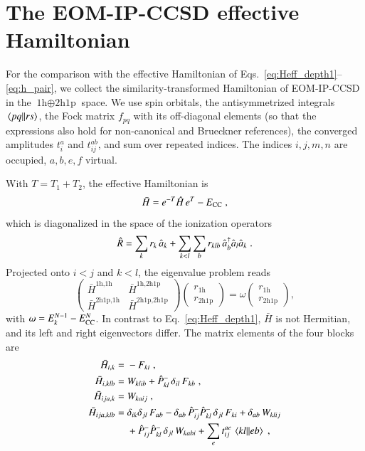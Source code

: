 \documentclass[aip,jcp,reprint,noshowkeys,superscriptaddress]{revtex4-1}
\newcommand{\cre}[1]{\Hat{a}_{#1}^{\dag}}
\newcommand{\ani}[1]{\Hat{a}_{#1}}
\newcommand{\h}{\text{1h}}
\newcommand{\hhp}{\text{2h1p}}
\begin{document}
\section{\label{sec:eom_ip_ccsd}The EOM-IP-CCSD effective Hamiltonian}
For the comparison with the effective Hamiltonian of
Eqs.~\eqref{eq:Heff_depth1}--\eqref{eq:h_pair}, we collect the
similarity-transformed Hamiltonian of EOM-IP-CCSD in the $\h\oplus\hhp$
space.\cite{Stanton1994,Nooijen1995} We use spin orbitals, the antisymmetrized
integrals $\mel{pq}{}{rs}$, the Fock matrix $f_{pq}$ with its off-diagonal
elements (so that the expressions also hold for non-canonical and Brueckner
references), the converged amplitudes $t_i^a$ and $t_{ij}^{ab}$, and sum over
repeated indices. The indices $i,j,m,n$ are occupied, $a,b,e,f$ virtual.

With $T=T_1+T_2$, the effective Hamiltonian is
\begin{equation}
\bar H=e^{-T}\hat H\,e^{T}-E_{\rm CC} \;,
\nonumber
\end{equation}
which is diagonalized in the space of the ionization operators
\begin{equation}
\hat R=\sum_k r_k\,\ani{k}+\sum_{k<l}\sum_{b} r_{klb}\,\cre{b}\ani{l}\ani{k} \;.
\nonumber
\end{equation}
Projected onto $i<j$ and $k<l$, the eigenvalue problem reads
\begin{equation}
\begin{pmatrix}
\bar H^{\h,\h} & \bar H^{\h,\hhp}
\\
\bar H^{\hhp,\h} & \bar H^{\hhp,\hhp}
\end{pmatrix}
\begin{pmatrix} r_{\h} \\ r_{\hhp} \end{pmatrix}
=\omega
\begin{pmatrix} r_{\h} \\ r_{\hhp} \end{pmatrix} ,
\label{eq:eom_Hbar}
\end{equation}
with $\omega=E^{N-1}_k-E^{N}_{\rm CC}$. In contrast to
Eq.~\eqref{eq:Heff_depth1}, $\bar H$ is not Hermitian, and its left and
right eigenvectors differ. The matrix elements of the four blocks are
\begin{align}
\bar H_{i,k}
={}&
-F_{ki} \;,
\nonumber\\
\bar H_{i,klb}
={}&
W_{klib}
+\hat P^-_{kl}\,\delta_{il}\,F_{kb} \;,
\nonumber\\
\bar H_{ija,k}
={}&
W_{kaij} \;,
\nonumber\\
\bar H_{ija,klb}
={}&
\delta_{ik}\delta_{jl}\,F_{ab}
-\delta_{ab}\,\hat P^-_{ij}\hat P^-_{kl}\,\delta_{jl}\,F_{ki}
+\delta_{ab}\,W_{klij}
\nonumber\\
&+\hat P^-_{ij}\hat P^-_{kl}\,\delta_{jl}\,W_{kabi}
+\sum_e t_{ij}^{ae}\,\mel{kl}{}{eb} \;,
\label{eq:eom_blocks}
\end{align}
\end{document}
